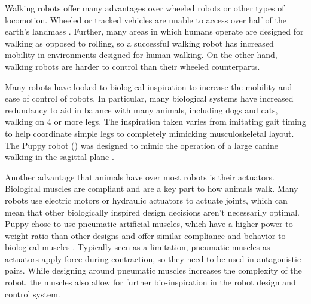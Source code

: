 Walking robots offer many advantages over wheeled robots or other types
of locomotion. Wheeled or tracked vehicles are unable to access over half
of the earth's landmass \cite{BigDog}. Further, many areas in which humans
operate are designed for walking as opposed to rolling, so a successful walking
robot has increased mobility in environments designed for human walking. On the
other hand, walking robots are harder to control than their wheeled
counterparts.

Many robots have looked to biological inspiration to increase the mobility and
ease of control of robots. In particular, many biological systems have increased
redundancy to aid in balance with many animals, including dogs and cats, walking
on 4 or more legs. The inspiration taken varies from imitating gait timing to
help coordinate simple legs to completely mimicking musculoskeletal layout. The
Puppy robot () was designed to mimic the operation of a large 
canine walking in the sagittal plane \cite{PuppyDesign}.

Another advantage that animals have over most robots is their actuators.
Biological muscles are compliant and are a key part to how animals walk. Many
robots use electric motors or hydraulic actuators to actuate joints, which can
mean that other biologically inspired design decisions aren't necessarily
optimal. Puppy chose to use pneumatic artificial muscles, which have a higher
power to weight ratio than other designs and offer similar compliance and
behavior to biological muscles \cite{Tavakoli2008}. Typically seen as a
limitation, pneumatic muscles as actuators apply force during contraction, so
they need to be used in antagonistic pairs. While designing around pneumatic muscles increases the complexity
of the robot, the muscles also allow for further bio-inspiration in the robot design
and control system.

